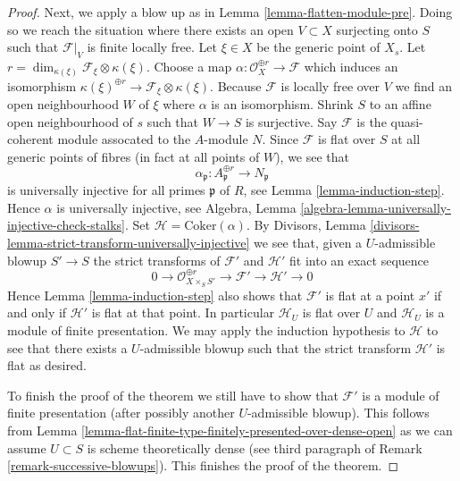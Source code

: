 \begin{proof}
\medskip\noindent
Next, we apply a blow up as in Lemma \ref{lemma-flatten-module-pre}.
Doing so we reach the situation where there exists an
open $V \subset X$ surjecting onto $S$ such that $\mathcal{F}|_V$
is finite locally free. Let $\xi \in X$ be the generic point of $X_s$. Let
$r = \dim_{\kappa(\xi)} \mathcal{F}_\xi \otimes \kappa(\xi)$.
Choose a map $\alpha : \mathcal{O}_X^{\oplus r} \to \mathcal{F}$
which induces an isomorphism
$\kappa(\xi)^{\oplus r} \to \mathcal{F}_\xi \otimes \kappa(\xi)$.
Because $\mathcal{F}$ is locally free over $V$ we find an open neighbourhood
$W$ of $\xi$ where $\alpha$ is an isomorphism. Shrink $S$ to an affine open
neighbourhood of $s$ such that $W \to S$ is surjective. Say $\mathcal{F}$
is the quasi-coherent module assocated to the $A$-module $N$. Since
$\mathcal{F}$ is flat over $S$ at all generic points of fibres
(in fact at all points of $W$), we see that
$$
\alpha_\mathfrak p : A_\mathfrak p^{\oplus r} \to N_\mathfrak p
$$
is universally injective for all primes $\mathfrak p$ of $R$, see
Lemma \ref{lemma-induction-step}. Hence $\alpha$ is universally injective,
see Algebra, Lemma \ref{algebra-lemma-universally-injective-check-stalks}.
Set $\mathcal{H} = \text{Coker}(\alpha)$.
By Divisors, Lemma \ref{divisors-lemma-strict-transform-universally-injective}
we see that, given a $U$-admissible blowup $S' \to S$
the strict transforms of $\mathcal{F}'$ and $\mathcal{H}'$
fit into an exact sequence
$$
0 \to \mathcal{O}_{X \times_S S'}^{\oplus r} \to \mathcal{F}'
\to \mathcal{H}' \to 0
$$
Hence Lemma \ref{lemma-induction-step} also shows that $\mathcal{F}'$
is flat at a point $x'$ if and only if
$\mathcal{H}'$ is flat at that point. In particular $\mathcal{H}_U$ is
flat over $U$ and $\mathcal{H}_U$ is a module of finite presentation.
We may apply the induction hypothesis to $\mathcal{H}$ to see that
there exists a $U$-admissible blowup such that the strict transform
$\mathcal{H}'$ is flat as desired.

\medskip\noindent
To finish the proof of the theorem we still have to show that $\mathcal{F}'$
is a module of finite presentation (after possibly another
$U$-admissible blowup). This follows from
Lemma \ref{lemma-flat-finite-type-finitely-presented-over-dense-open}
as we can assume $U \subset S$ is scheme theoretically dense (see
third paragraph of Remark \ref{remark-successive-blowups}).
This finishes the proof of the theorem.
\end{proof}





